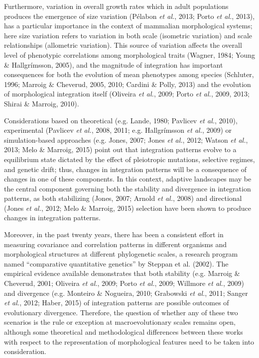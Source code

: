 \documentclass[12pt,twoside]{report}
\begin{document}
Furthermore, variation in overall growth rates which in adult
populations produces the emergence of size variation (Pélabon \emph{et
al.}, 2013; Porto \emph{et al.}, 2013), has a particular importance in
the context of mammalian morphological systems; here size variation
refers to variation in both scale (isometric variation) and scale
relationships (allometric variation). This source of variation affects
the overall level of phenotypic correlations among morphological traits
(Wagner, 1984; Young \& Hallgrímsson, 2005), and the magnitude of
integration has important consequences for both the evolution of mean
phenotypes among species (Schluter, 1996; Marroig \& Cheverud, 2005,
2010; Cardini \& Polly, 2013) and the evolution of morphological
integration itself (Oliveira \emph{et al.}, 2009; Porto \emph{et al.},
2009, 2013; Shirai \& Marroig, 2010).

Considerations based on theoretical (e.g. Lande, 1980; Pavlicev \emph{et
al.}, 2010), experimental (Pavlicev \emph{et al.}, 2008, 2011; e.g.
Hallgrímsson \emph{et al.}, 2009) or simulation-based approaches (e.g.
Jones, 2007; Jones \emph{et al.}, 2012; Watson \emph{et al.}, 2013; Melo
\& Marroig, 2015) point out that integration patterns evolve to a
equilibrium state dictated by the effect of pleiotropic mutations,
selective regimes, and genetic drift; thus, changes in integration
patterns will be a consequence of changes in one of these components. In
this context, adaptive landscapes may be the central component governing
both the stability and divergence in integration patterns, as both
stabilizing (Jones, 2007; Arnold \emph{et al.}, 2008) and directional
(Jones \emph{et al.}, 2012; Melo \& Marroig, 2015) selection have been
shown to produce changes in integration patterns.

Moreover, in the past twenty years, there has been a consistent effort
in measuring covariance and correlation patterns in different organisms
and morphological structures at different phylogenetic scales, a
research program named ``comparative quantitative genetics'' by Steppan
et al. (2002). The empirical evidence available demonstrates that both
stability (e.g. Marroig \& Cheverud, 2001; Oliveira \emph{et al.}, 2009;
Porto \emph{et al.}, 2009; Willmore \emph{et al.}, 2009) and divergence
(e.g. Monteiro \& Nogueira, 2010; Grabowski \emph{et al.}, 2011; Sanger
\emph{et al.}, 2012; Haber, 2015) of integration patterns are possible
outcomes of evolutionary divergence. Therefore, the question of whether
any of these two scenarios is the rule or exception at macroevolutionary
scales remains open, although some theoretical and methodological
differences between these works with respect to the representation of
morphological features need to be taken into consideration.
\end{document}
